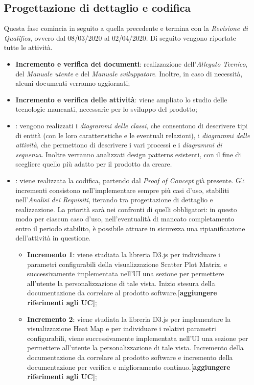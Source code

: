 \subsection{Progettazione di dettaglio e codifica}
Questa fase comincia in seguito a quella precedente e termina con la \textit{Revisione di Qualifica}, ovvero dal 08/03/2020 al 02/04/2020. Di seguito vengono riportate tutte le attività.

\begin{itemize}
	\item \textbf{Incremento e verifica dei documenti}: realizzazione dell'\textit{Allegato Tecnico}, del \textit{Manuale utente} e del \textit{Manuale sviluppatore}. Inoltre, in caso di necessità, alcuni documenti verranno aggiornati;
	\item \textbf{Incremento e verifica delle attività}: viene ampliato lo studio delle tecnologie mancanti, necessarie per lo sviluppo del prodotto; 
	\item \textbf{}: vengono realizzati i \textit{diagrammi delle classi}, che consentono di descrivere tipi di entità (con le loro caratteristiche e le eventuali relazioni), i \textit{diagrammi delle attività}, che permettono di descrivere i vari processi e i \textit{diagrammi di sequenza}. Inoltre verranno analizzati design patterns esistenti, con il fine di scegliere quello più adatto per il prodotto da creare.
	\item \textbf{}: viene realizzata la codifica, partendo dal \textit{Proof of Concept} già presente. Gli incrementi consistono nell'implementare sempre più casi d'uso, stabiliti nell'\textit{Analisi dei Requisiti}, iterando tra progettazione di dettaglio e realizzazione. La priorità sarà nei confronti di quelli obbligatori: in questo modo per ciascun caso d'uso, nell'eventualità di mancato completamento entro il periodo stabilito, è possibile attuare in sicurezza una ripianificazione dell'attività in questione.
	\begin{itemize}
	\item \textbf{Incremento 1}: viene studiata la libreria D3.js per individuare i parametri configurabili della visualizzazione Scatter Plot Matrix, e successivamente implementata nell'UI una sezione per permettere all'utente la personalizzazione di tale vista. Inizio stesura della documentazione da correlare al prodotto software.\textbf{[aggiungere riferimenti agli UC]};
	
	\item \textbf{Incremento 2}: viene studiata la libreria D3.js per implementare la visualizzazione Heat Map e per individuare i relativi parametri configurabili, viene successivamente implementata nell'UI una sezione per permettere all'utente la personalizzazione di tale vista. Incremento della documentazione da correlare al prodotto software e incremento della documentazione per verifica e miglioramento continuo.\textbf{[aggiungere riferimenti agli UC]};
	

\end{itemize}
\end{itemize}
